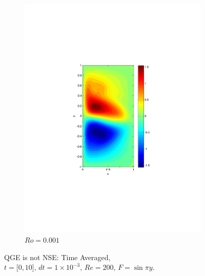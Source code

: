 \begin{figure}
\begin{center}
\begin{subfigure}{0.3\textwidth}
    \includegraphics[scale=0.5]{Figures/Re200Ro1E-3h16k1000}
    \caption{$Ro=0.001$}
    \label{sfi:QGERo0.001}
  \end{subfigure}
  \caption{QGE is not NSE: Time Averaged, $t=\lbrack 0, 10\rbrack,\, dt=1\times
    10^{-3},\, Re= 200,\, F = \sin \pi y$.}
  \label{fig:NSEnotQGE}
  \end{center}
\end{figure}

